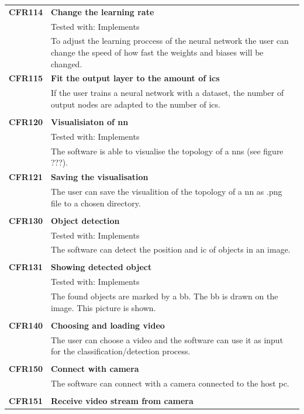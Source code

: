 \documentclass[parskip=full]{scrartcl}
\begin{document}
\begin{tabular}{p{2cm}p{12cm}}
\textbf {CFR114} & \textbf{Change the learning rate} \\
& Tested with: Implements\\
& To adjust the learning proccess of the neural network the user can change the speed of how fast the weights and biases will be changed.\\
\textbf{CFR115} & \textbf{Fit the output layer to the amount of \glspl{ic}}\\
& If the user trains a neural network with a dataset, the number of output nodes are adapted to the number of \glspl{ic}.\\
& \\
\textbf {CFR120} & \textbf{Visualisiaton of \gls{nn}} \\
& Tested with: Implements\\
& The software is able to visualise the topology of a \glspl{nn} (see figure ???).\\
\textbf{CFR121} & \textbf{Saving the visualisation}\\
& The user can save the visualition of the topology of a \gls{nn} as .png file to a chosen directory.\\
& \\
\textbf {CFR130} & \textbf{Object detection} \\
& Tested with: Implements\\
& The software can detect the position and \gls{ic} of objects in an image.\\
& \\
\textbf {CFR131} & \textbf{Showing detected object} \\
& Tested with: Implements\\
& The found objects are marked by a \gls{bb}. The \gls{bb} is drawn on the image. This picture is shown.\\
& \\
\textbf{CFR140} & \textbf{Choosing and loading video}\\
& The user can choose a video and the software can use it as input for the classification/detection process.\\
& \\
\textbf{CFR150} & \textbf{Connect with camera}\\
& The software can connect with a camera connected to the \gls{host pc}.\\
& \\
\textbf{CFR151} & \textbf{Receive video stream from camera}\\

\end{tabular}
\end{document}
